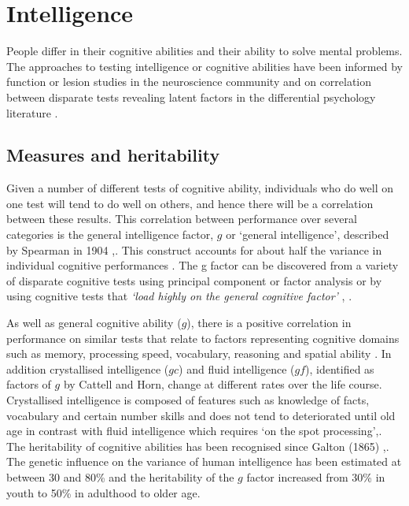 \section{Intelligence}
\label{sec:Introduction intelligence}

People differ in their cognitive abilities and their ability to solve mental problems. The approaches to testing intelligence or cognitive abilities have been informed by function or lesion studies in the neuroscience community and on correlation between disparate tests revealing latent factors in the differential psychology literature \cite{deary2014stability}. %
\subsection{Measures and heritability}
\label{sec:intelligence measures and heritability}
Given a number of different tests of cognitive ability, individuals who do well on one test will tend to do well on others, and hence there will be a correlation between these results. This correlation between performance over several categories is the general intelligence factor, $g$ or ‘general intelligence’, described by Spearman in 1904  \cite{deary2001intelligence}%
,\cite{deary2014stability}. This construct accounts for about half the variance in individual cognitive performances \cite{deary2009genetic}.
 The g factor can be discovered from a variety of disparate cognitive tests using principal component or factor analysis or by using cognitive tests that \textit{`load highly on the general cognitive factor'} \cite{johnson2004just},
 \cite{deary2009genetic}. 

As well as general cognitive ability ($g$), there is a positive correlation in performance on similar tests that relate to factors representing cognitive domains such as memory, processing speed, vocabulary, reasoning and spatial ability \cite{deary2010cognitive}.
In addition crystallised intelligence ($gc$) and fluid intelligence ($gf$), identified as factors of $g$ by Cattell and Horn, change at different rates over the life course. Crystallised intelligence is composed of features such as knowledge of facts, vocabulary and certain number skills and does not tend to deteriorated until old age in contrast with fluid intelligence which requires ‘on the spot processing’\cite{deary2010cognitive},\cite{davies2015genetic}.
The heritability of cognitive abilities has been recognised since Galton (1865) \cite{deary2001human},\cite{galton1869hereditary}. 
The genetic influence on the variance of human intelligence has been estimated at between 30 and 80\% and the heritability of the $g$ factor increased from 30\% in youth to 50\% in adulthood to older age\cite{deary2009genetic}.


